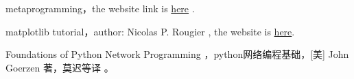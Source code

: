 \documentclass[12pt,oneside]{book}
\begin{document}
\begin{common-format}
\begin{thebibliography}{9}
 metaprogramming，the website link is \href{http://python-3-patterns-idioms-test.readthedocs.org/en/latest/Metaprogramming.html}{here} .

 matplotlib tutorial，author: Nicolas P. Rougier , the website is  \href{http://www.labri.fr/perso/nrougier/teaching/matplotlib/}{here}.  

  Foundations of Python Network Programming ，python网络编程基础，[美] John Goerzen 著，莫迟等译 。


\end{thebibliography}




\end{common-format}
\end{document}
